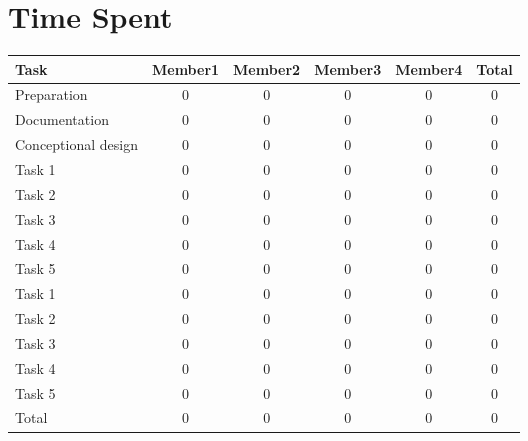 \newpage

\section{Time Spent}

\begin{tabular} {| l | c | c | c | c | c |} \hline

	Task 								& 	Member1 	& 	Member2 	& 	Member3 	& 	Member4 		& 	Total 	\\ \hline \hline
	
	Preparation							& 	0				&	0				&	0				&	0					&	0		\\ \hline
	Documentation						& 	0				&	0				&	0				&	0					&	0		\\ \hline
	Conceptional design					& 	0				&	0				&	0				&	0					&	0		\\ \hline \hline
	
	Task 1								& 	0				&	0				&	0				&	0					&	0		\\ \hline
	Task 2								& 	0				&	0				&	0				&	0					&	0		\\ \hline
	Task 3								& 	0				&	0				&	0				&	0					&	0		\\ \hline
	Task 4								& 	0				&	0				&	0				&	0					&	0		\\ \hline
	Task 5								& 	0				&	0				&	0				&	0					&	0		\\ \hline \hline

	Task 1								& 	0				&	0				&	0				&	0					&	0		\\ \hline
	Task 2								& 	0				&	0				&	0				&	0					&	0		\\ \hline
	Task 3								& 	0				&	0				&	0				&	0					&	0		\\ \hline
	Task 4								& 	0				&	0				&	0				&	0					&	0		\\ \hline
	Task 5								& 	0				&	0				&	0				&	0					&	0		\\ \hline \hline
	Total								&	0				&	0				&	0				&	0					&	0		\\ \hline
	
\end{tabular}
